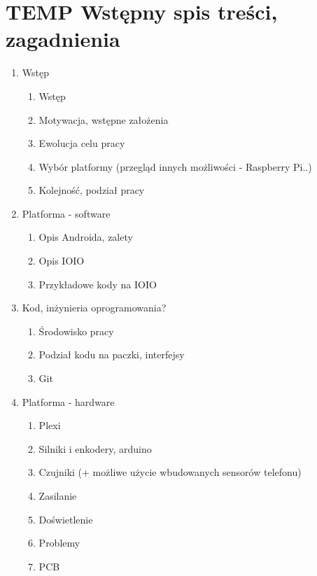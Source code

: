 
\chapter*{TEMP Wstępny spis treści, zagadnienia}

\begin{enumerate}
	\item{Wstęp}
	\begin{enumerate}
		\item{Wstęp}
		\item{Motywacja, wstępne założenia}
		\item{Ewolucja celu pracy}
		\item{Wybór platformy (przegląd innych możliwości - Raspberry Pi..)}
		\item{Kolejność, podział pracy}
	\end{enumerate}
	
	\item{Platforma - software}
	\begin{enumerate}
		\item{Opis Androida, zalety}
		\item{Opis IOIO}
		\item{Przykładowe kody na IOIO}
	\end{enumerate}
	
	\item{Kod, inżynieria oprogramowania?}
	\begin{enumerate}
		\item{Środowisko pracy}
		\item{Podział kodu na paczki, interfejsy}
		\item{Git}
	\end{enumerate}
	
	\item{Platforma - hardware}
	\begin{enumerate}
		\item{Plexi}
		\item{Silniki i enkodery, arduino}
		\item{Czujniki (+ możliwe użycie wbudowanych sensorów telefonu)}
		\item{Zasilanie}
		\item{Doświetlenie}
		\item{Problemy}
		\item{PCB}
	\end{enumerate}
	

\end{enumerate}
